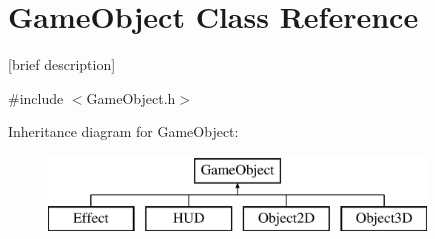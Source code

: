 \hypertarget{class_game_object}{\section{Game\-Object Class Reference}
\label{class_game_object}
}


\mbox{[}brief description\mbox{]}  




{\ttfamily \#include $<$Game\-Object.\-h$>$}

Inheritance diagram for Game\-Object\-:\begin{figure}[H]
\begin{center}
\leavevmode
\includegraphics[height=2.000000cm]{class_game_object}
\end{center}
\end{figure}
